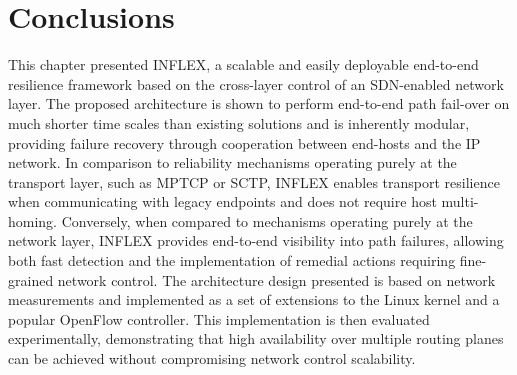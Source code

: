 \section{Conclusions}
\label{section:conc}

This chapter presented INFLEX, a scalable and easily deployable end-to-end resilience framework based on the cross-layer control of an \ac{SDN}-enabled network layer.
The proposed architecture is shown to perform end-to-end path fail-over on much shorter time scales than existing solutions and is inherently modular, providing failure recovery through cooperation between end-hosts and the \ac{IP} network. 
In comparison to reliability mechanisms operating purely at the transport layer, such as \ac{MPTCP} or \ac{SCTP}, INFLEX enables transport resilience when communicating with legacy endpoints and does not require host multi-homing. 
Conversely, when compared to mechanisms operating purely at the network layer, INFLEX provides end-to-end visibility into path failures, allowing both fast detection and the implementation of remedial actions requiring fine-grained network control. 
The architecture  design presented is based on network measurements and implemented as a set of extensions to the Linux kernel and a popular OpenFlow controller. 
This implementation is then evaluated experimentally, demonstrating that high availability over multiple routing planes can be achieved without compromising network control scalability.

